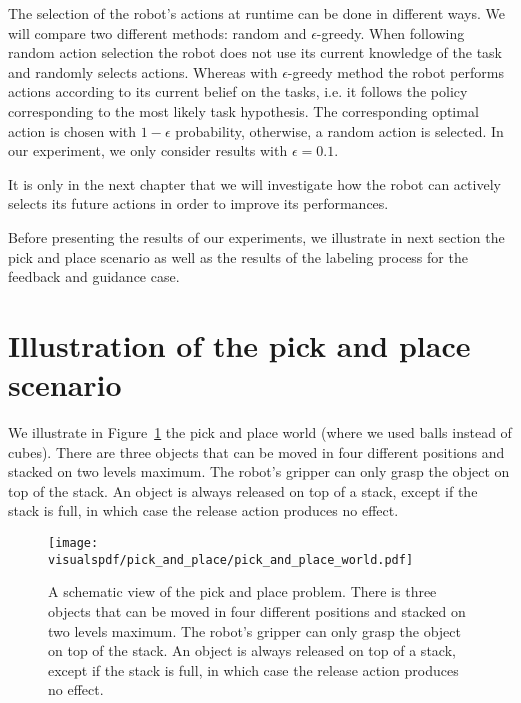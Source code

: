 The selection of the robot's actions at runtime can be done in different ways. We will compare two different methods: random and  $\epsilon$-greedy. When following random action selection the robot does not use its current knowledge of the task and randomly selects actions. Whereas with $\epsilon$-greedy method the robot performs actions according to its current belief on the tasks, i.e. it follows the policy corresponding to the most likely task hypothesis. The corresponding optimal action is chosen with $1-\epsilon$ probability, otherwise, a random action is selected. In our experiment, we only consider results with $\epsilon =  0.1$.

It is only in the next chapter that we will investigate how the robot can actively selects its future actions in order to improve its performances.

\transition

Before presenting the results of our experiments, we illustrate in next section the pick and place scenario as well as the results of the labeling process for the feedback and guidance case.

\section{Illustration of the pick and place scenario}
\label{chapter:lfui:pickplace}

We illustrate in Figure~\ref{fig:lfui:pickplaceworld} the pick and place world (where we used balls instead of cubes). There are three objects that can be moved in four different positions and stacked on two levels maximum. The robot's gripper can only grasp the object on top of the stack. An object is always released on top of a stack, except if the stack is full, in which case the release action produces no effect.

\begin{figure}[!htbp]
  \centering
  \texttt{[image: \\visualspdf/pick\_and\_place/pick\_and\_place\_world.pdf]}
  \caption{A schematic view of the pick and place problem. There is three objects that can be moved in four different positions and stacked on two levels maximum. The robot's gripper can only grasp the object on top of the stack. An object is always released on top of a stack, except if the stack is full, in which case the release action produces no effect.}
  \label{fig:lfui:pickplaceworld}
\end{figure}

